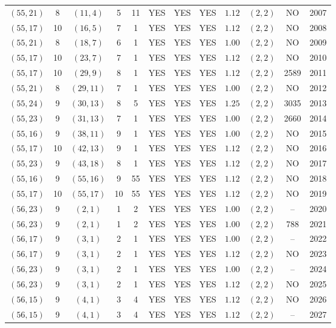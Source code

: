 \begin{longtable}{|c|c|c|c|c|c|c|c|c|c|c|c|}
$(55,21)$ & 8 & $(11,4)$ & 5 & 11 & YES & YES & YES & $1.12$ & $(2,2)$ & NO & 2007\\
$(55,17)$ & 10 & $(16,5)$ & 7 & 1 & YES & YES & YES & $1.12$ & $(2,2)$ & NO & 2008\\
$(55,21)$ & 8 & $(18,7)$ & 6 & 1 & YES & YES & YES & $1.00$ & $(2,2)$ & NO & 2009\\
$(55,17)$ & 10 & $(23,7)$ & 7 & 1 & YES & YES & YES & $1.12$ & $(2,2)$ & NO & 2010\\
$(55,17)$ & 10 & $(29,9)$ & 8 & 1 & YES & YES & YES & $1.12$ & $(2,2)$ & 2589 & 2011\\
$(55,21)$ & 8 & $(29,11)$ & 7 & 1 & YES & YES & YES & $1.00$ & $(2,2)$ & NO & 2012\\
$(55,24)$ & 9 & $(30,13)$ & 8 & 5 & YES & YES & YES & $1.25$ & $(2,2)$ & 3035 & 2013\\
$(55,23)$ & 9 & $(31,13)$ & 7 & 1 & YES & YES & YES & $1.00$ & $(2,2)$ & 2660 & 2014\\
$(55,16)$ & 9 & $(38,11)$ & 9 & 1 & YES & YES & YES & $1.00$ & $(2,2)$ & NO & 2015\\
$(55,17)$ & 10 & $(42,13)$ & 9 & 1 & YES & YES & YES & $1.12$ & $(2,2)$ & NO & 2016\\
$(55,23)$ & 9 & $(43,18)$ & 8 & 1 & YES & YES & YES & $1.12$ & $(2,2)$ & NO & 2017\\
$(55,16)$ & 9 & $(55,16)$ & 9 & 55 & YES & YES & YES & $1.12$ & $(2,2)$ & NO & 2018\\
$(55,17)$ & 10 & $(55,17)$ & 10 & 55 & YES & YES & YES & $1.12$ & $(2,2)$ & NO & 2019\\
$(56,23)$ & 9 & $(2,1)$ & 1 & 2 & YES & YES & YES & $1.00$ & $(2,2)$ & -- & 2020\\
$(56,23)$ & 9 & $(2,1)$ & 1 & 2 & YES & YES & YES & $1.00$ & $(2,2)$ & 788 & 2021\\
$(56,17)$ & 9 & $(3,1)$ & 2 & 1 & YES & YES & YES & $1.00$ & $(2,2)$ & -- & 2022\\
$(56,17)$ & 9 & $(3,1)$ & 2 & 1 & YES & YES & YES & $1.12$ & $(2,2)$ & NO & 2023\\
$(56,23)$ & 9 & $(3,1)$ & 2 & 1 & YES & YES & YES & $1.00$ & $(2,2)$ & -- & 2024\\
$(56,23)$ & 9 & $(3,1)$ & 2 & 1 & YES & YES & YES & $1.12$ & $(2,2)$ & NO & 2025\\
$(56,15)$ & 9 & $(4,1)$ & 3 & 4 & YES & YES & YES & $1.12$ & $(2,2)$ & NO & 2026\\
$(56,15)$ & 9 & $(4,1)$ & 3 & 4 & YES & YES & YES & $1.12$ & $(2,2)$ & -- & 2027\\

\end{longtable}
